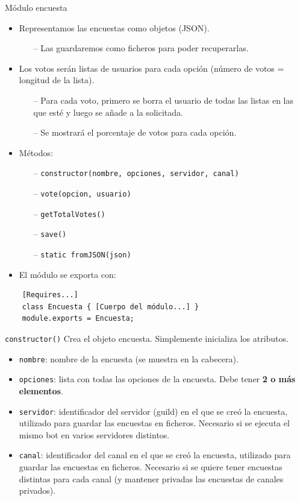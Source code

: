 \documentclass[10pt]{beamer} %
\begin{document}
\begin{frame}[fragile]{Módulo encuesta}
    \begin{itemize}
        \item Representamos las encuestas como objetos (JSON).
        \begin{itemize}
            \item[--] Las guardaremos como ficheros para poder recuperarlas.
        \end{itemize}
        \item Los votos serán listas de usuarios para cada opción (número de votos = longitud de la lista).
        \begin{itemize}
            \item[--] Para cada voto, primero se borra el usuario de todas las listas en las que esté y luego se añade a la solicitada.
            \item[--] Se mostrará el porcentaje de votos para cada opción.
        \end{itemize}
        \item Métodos:
        \begin{itemize}
            \item[--] \texttt{constructor(nombre, opciones, servidor, canal)}
            \item[--] \texttt{vote(opcion, usuario)}
            \item[--] \texttt{getTotalVotes()}
            \item[--] \texttt{save()}
            \item[--] \texttt{static fromJSON(json)}
        \end{itemize}
        \item El módulo se exporta con:
    \end{itemize}
    \begin{verbatim}
    [Requires...]
    class Encuesta { [Cuerpo del módulo...] }
    module.exports = Encuesta;
    \end{verbatim}
\end{frame}
\begin{frame}{\texttt{constructor()}}
    Crea el objeto encuesta. Simplemente inicializa los atributos.
    \begin{itemize}
        \item \texttt{nombre}: nombre de la encuesta (se muestra en la cabecera).
        \item \texttt{opciones}: lista con todas las opciones de la encuesta. Debe tener \textbf{2 o más elementos}.
        \item \texttt{servidor}: identificador del servidor (guild) en el que se creó la encuesta, utilizado para guardar las encuestas en ficheros. Necesario si se ejecuta el mismo bot en varios servidores distintos.
        \item \texttt{canal}: identificador del canal en el que se creó la encuesta, utilizado para guardar las encuestas en ficheros. Necesario si se quiere tener encuestas distintas para cada canal (y mantener privadas las encuestas de canales privados).
    \end{itemize}
\end{frame}
\end{document}

